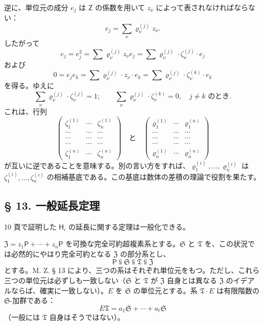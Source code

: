 逆に、単位元の成分 $e_j$ は $\mathsf Z$ の係数を用いて $z_\nu$ によって表されなければならない：
\[
e_j=\sum_\nu \varrho_\nu^{(j)}z_\nu .
\]
したがって
\[
e_j=e_j^2=\sum \varrho_\nu^{(j)}z_\nu e_j
=\sum \varrho_\nu^{(j)}\cdot\zeta_\nu^{(j)}\cdot e_j
\]
および
\[
0=e_je_k=\sum \varrho_\nu^{(j)}\cdot z_\nu\cdot e_k
=\sum \varrho_\nu^{(j)}\cdot\zeta_\nu^{(k)}\cdot e_k
\]
を得る。ゆえに
\[
\sum_\nu \varrho_\nu^{(j)}\cdot\zeta_\nu^{(j)}=1;
\qquad
\sum_\nu \varrho_\nu^{(j)}\cdot\zeta_\nu^{(k)}=0,\quad
\text{$j\ne k$ のとき}.
\]
これは、行列
\[
\begin{pmatrix}
\zeta_1^{(1)} & \cdots & \zeta_n^{(1)}\\
\cdots & \cdots & \cdots\\
\cdots & \cdots & \cdots\\
\cdots & \cdots & \cdots\\
\zeta_1^{(n)} & \cdots & \zeta_n^{(n)}
\end{pmatrix}
\quad\text{と}\quad
\begin{pmatrix}
\varrho_1^{(1)} & \cdots & \varrho_1^{(n)}\\
\cdots & \cdots & \cdots\\
\cdots & \cdots & \cdots\\
\cdots & \cdots & \cdots\\
\varrho_n^{(1)} & \cdots & \varrho_n^{(n)}
\end{pmatrix}
\]
が互いに逆であることを意味する。別の言い方をすれば、$\varrho_1^{(i)},\ldots,\varrho_n^{(i)}$ は $\zeta_1^{(i)},\ldots,\zeta_n^{(i)}$ の相補基底である。この基底は数体の差積の理論で役割を果たす。

\subsection*{§ 13. 一般延長定理}\label{der-allgemeine-fortsetzungssatz}

10 頁で証明した $\mathsf{H}_i$ の延長に関する定理は一般化できる。

$\mathfrak Z=z_1\mathsf P+\cdots+z_n\mathsf P$ を可換な完全可約超複素系とする。$\mathfrak S$ と $\mathfrak T$ を、この状況では必然的にやはり完全可約となる $\mathfrak Z$ の部分系とし、
\[
\mathsf P\subseteqq\mathfrak S\subseteqq\mathfrak T\subseteqq\mathfrak Z 
\]
とする。M. Z. § 13 により、三つの系はそれぞれ単位元をもつ。ただし、これら三つの単位元は必ずしも一致しない（$\mathfrak S$ と $\mathfrak T$ が $\mathfrak Z$ 自身とは異なる $\mathfrak Z$ のイデアルならば、確実に一致しない）。$E$ を $\mathfrak S$ の単位元とする。系 $\mathfrak T\cdot E$ は有限階数の $\mathfrak S$-加群である：
\[
E\mathfrak T=a_1\mathfrak S+\cdots+a_t\mathfrak S
\]
（一般には $\mathfrak T$ 自身はそうではない）。

